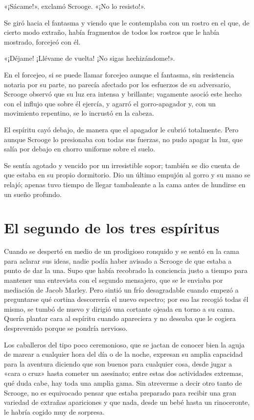\documentclass{novela}
\begin{document}
 «¡Sácame!», exclamó Scrooge. «¡No lo resisto!».

 Se giró hacia el fantasma y viendo que le contemplaba con un rostro en el que, de cierto modo extraño, había fragmentos de todos los rostros que le había mostrado, forcejeó con él.

 «¡Déjame! ¡Llévame de vuelta! ¡No sigas hechizándome!».

 En el forcejeo, si se puede llamar forcejeo aunque el fantasma, sin resistencia notaria por su parte, no parecía afectado por los esfuerzos de su adversario, Scrooge observó que su luz era intensa y brillante; vagamente asoció este hecho con el influjo que sobre él ejercía, y agarró el gorro-apagador y, con un movimiento repentino, se lo incrustó en la cabeza.

 El espíritu cayó debajo, de manera que el apagador le cubrió totalmente. Pero aunque Scrooge lo presionaba con todas sus fuerzas, no pudo apagar la luz, que salía por debajo en chorro uniforme sobre el suelo.

 Se sentía agotado y vencido por un irresistible sopor; también se dio cuenta de que estaba en su propio dormitorio. Dio un último empujón al gorro y su mano se relajó; apenas tuvo tiempo de llegar tambaleante a la cama antes de hundirse en un sueño profundo.




 \chapter{El segundo de los tres espíritus}



 Cuando se despertó en medio de un prodigioso ronquido y se sentó en la cama para aclarar sus ideas, nadie podía haber avisado a Scrooge de que estaba a punto de dar la una. Supo que había recobrado la conciencia justo a tiempo para mantener una entrevista con el segundo mensajero, que se le enviaba por mediación de Jacob Marley. Pero sintió un frío desagradable cuando empezó a preguntarse qué cortina descorrería el nuevo espectro; por eso las recogió todas él mismo, se tumbó de nuevo y dirigió una cortante ojeada en torno a su cama. Quería plantar cara al espíritu cuando apareciera y no deseaba que le cogiera desprevenido porque se pondría nervioso.

 Los caballeros del tipo poco ceremonioso, que se jactan de conocer bien la aguja de marear a cualquier hora del día o de la noche, expresan su amplia capacidad para la aventura diciendo que son buenos para cualquier cosa, desde jugar a «cara o cruz» hasta cometer un asesinato; entre estas dos actividades extremas, qué duda cabe, hay toda una amplia gama. Sin atreverme a decir otro tanto de Scrooge, no es equivocado pensar que estaba preparado para recibir una gran variedad de extrañas apariciones y que nada, desde un bebé hasta un rinoceronte, le habría cogido muy de sorpresa.
\end{document}
